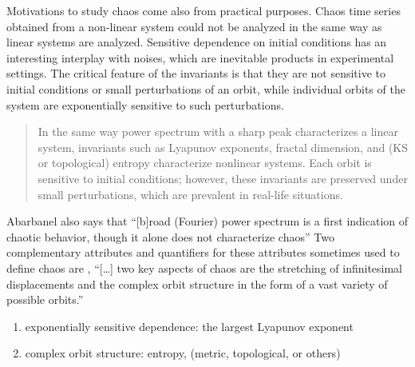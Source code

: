 \documentclass[10pt,twoside,draft]{book}
\begin{document}
Motivations to study chaos come also from practical purposes.
Chaos time series obtained from a non-linear system could not be analyzed in the same way as linear systems are analyzed.
Sensitive dependence on initial conditions has an interesting interplay with noises, which are inevitable products in experimental settings.
The critical feature of the invariants is that they are not sensitive to initial conditions or small perturbations of an orbit, while individual orbits of the system are exponentially sensitive to such perturbations. \citep[p.1334]{abarbanel}
\begin{quote}
  In the same way power spectrum with a sharp peak characterizes a linear system, invariants such as Lyapunov exponents, fractal dimension, and (KS or topological) entropy characterize nonlinear systems.
  Each orbit is sensitive to initial conditions; however, these invariants are preserved under small perturbations, which are prevalent in real-life situations.
\end{quote}
Abarbanel also says that ``[b]road (Fourier) power spectrum is a first indication of chaotic behavior, though it alone does not characterize chaos''
Two complementary attributes and quantifiers for these attributes sometimes used to define chaos are \citep[p.379]{abarbanel},
``[\ldots] two key aspects of chaos are the stretching of infinitesimal displacements and the complex orbit structure in the form of a vast variety of possible orbits.'' \citep[p.31]{ott1994}
\begin{enumerate}
  \item exponentially sensitive dependence: the largest Lyapunov exponent 
  \item complex orbit structure: entropy, (metric, topological, or others)
\end{enumerate}
\end{document}
